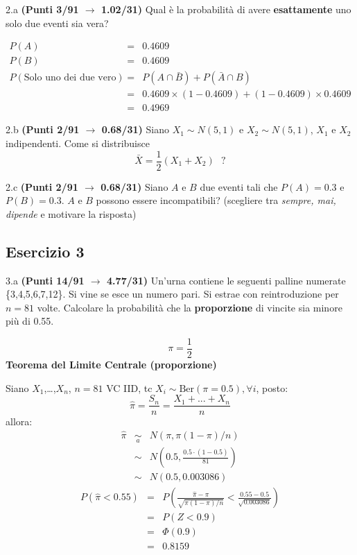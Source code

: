\documentclass[
  11pt,
]{book}
\theoremstyle{mytheoremstyle}
\theoremstyle{mydefstyle}
\newenvironment{sol}
  {
  \begin{tcolorbox}[enhanced,breakable,arc=0.1mm,boxrule=1pt,colback=white,colframe=iblue,
  title=\bf \fontfamily{lmss}\selectfont \hspace{.5 cm} Soluzione,drop fuzzy shadow]

}{
\end{tcolorbox}
  }
\begin{document}
2.a \textbf{(Punti 3/91 \(\rightarrow\) 1.02/31)} Qual è la probabilità di avere \textbf{esattamente} uno solo due eventi sia vera?

\begin{sol}
\begin{eqnarray*}
  P(A) &=&  0.4609\\
  P(B) &=& 0.4609\\
  P(\text{Solo uno dei due vero}) &=& P(A\cap\bar B)+P(\bar A\cap B)\\
  &=& 0.4609\times (1 - 0.4609)+(1-0.4609)\times  0.4609\\
  &=& 0.4969
\end{eqnarray*}

\end{sol}

2.b \textbf{(Punti 2/91 \(\rightarrow\) 0.68/31)} Siano \(X_1\sim N(5,1)\) e \(X_2\sim N(5,1)\), \(X_1\) e \(X_2\) indipendenti. Come si distribuisce
\[
\bar X = \frac 12 (X_1+X_2) ~~~?
\]

2.c \textbf{(Punti 2/91 \(\rightarrow\) 0.68/31)} Siano \(A\) e \(B\) due eventi tali che \(P(A)=0.3\) e \(P(B)=0.3\). \(A\) e \(B\) possono essere incompatibili? (scegliere tra \emph{sempre, mai, dipende} e motivare la risposta)

\subsection{Esercizio 3}\label{esercizio-3-33}

3.a \textbf{(Punti 14/91 \(\rightarrow\) 4.77/31)} Un'urna contiene le seguenti palline numerate \{3,4,5,6,7,12\}. Si vine se esce un numero pari. Si estrae con reintroduzione per \(n=81\) volte.
Calcolare la probabilità che la \textbf{proporzione} di vincite sia minore più di 0.55.

\begin{sol}
\[\pi=\frac 12\]
\textbf{Teorema del Limite Centrale (proporzione)}

Siano \(X_1\),\ldots,\(X_n\), \(n=81\) VC IID, tc \(X_i\sim\text{Ber}(\pi=0.5)\)\(,\forall i\), posto:
\[
      \hat\pi=\frac{S_n}n = \frac{X_1 + ... + X_n}n
      \]
allora:\begin{eqnarray*}
  \hat\pi & \mathop{\sim}\limits_{a}& N(\pi,\pi(1-\pi)/n) \\
  &\sim & N\left(0.5,\frac{0.5\cdot(1-0.5)}{81}\right) \\
     &\sim & N(0.5,0.003086) 
  \end{eqnarray*}\begin{eqnarray*}
      P( \hat\pi   <   0.55 ) 
        &=& P\left(  \frac { \hat\pi  -  \pi }{ \sqrt{\pi(1-\pi)/n} }  <  \frac { 0.55  -  0.5 }{\sqrt{ 0.003086 }} \right)  \\
                 &=& P\left(  Z   <   0.9 \right) \\    
                 &=&  \Phi( 0.9 ) \\ &=&  0.8159 
      \end{eqnarray*}

\end{sol}
\end{document}
